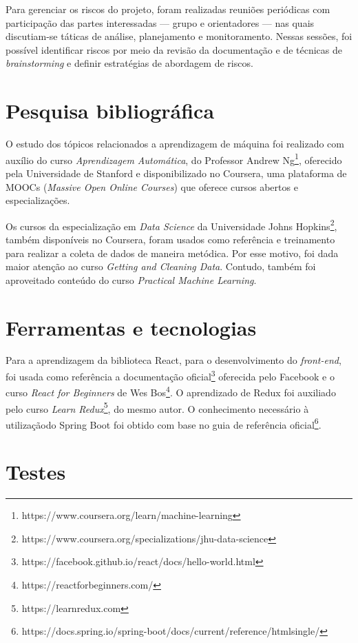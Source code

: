 Para gerenciar os riscos do projeto, foram realizadas reuniões periódicas com participação das partes interessadas --- grupo e orientadores --- nas quais discutiam-se táticas de análise, planejamento e monitoramento. Nessas sessões, foi possível identificar riscos por meio da revisão da documentação e de técnicas de \emph{brainstorming} e definir estratégias de abordagem de riscos.

\section{Pesquisa bibliográfica}

O estudo dos tópicos relacionados a aprendizagem de máquina foi realizado com auxílio do curso \emph{Aprendizagem Automática}, do Professor Andrew Ng\footnote{ https://www.coursera.org/learn/machine-learning}, oferecido pela Universidade de Stanford e disponibilizado no Coursera, uma plataforma de MOOCs (\textit{Massive Open Online Courses}) que oferece cursos abertos e especializações.

Os cursos da especialização em \textit{Data Science} da Universidade Johns Hopkins\footnote{ https://www.coursera.org/specializations/jhu-data-science}, também disponíveis no Coursera, foram usados como referência e treinamento para realizar a coleta de dados de maneira metódica. Por esse motivo, foi dada maior atenção ao curso \textit{Getting and Cleaning Data}. Contudo, também foi aproveitado conteúdo do curso \textit{Practical Machine Learning}.

\section{Ferramentas e tecnologias}

Para a aprendizagem da biblioteca React, para o desenvolvimento do \emph{front-end}, foi usada como referência a documentação oficial\footnote{https://facebook.github.io/react/docs/hello-world.html} oferecida pelo Facebook e o curso \textit{React for Beginners} de Wes Bos\footnote{ https://reactforbeginners.com/}. O aprendizado de Redux foi auxiliado pelo curso \textit{Learn Redux}\footnote{https://learnredux.com}, do mesmo autor. O conhecimento necessário à utilizaçãodo Spring Boot foi obtido com base no guia de referência oficial\footnote{https://docs.spring.io/spring-boot/docs/current/reference/htmlsingle/}.

\section{Testes}

